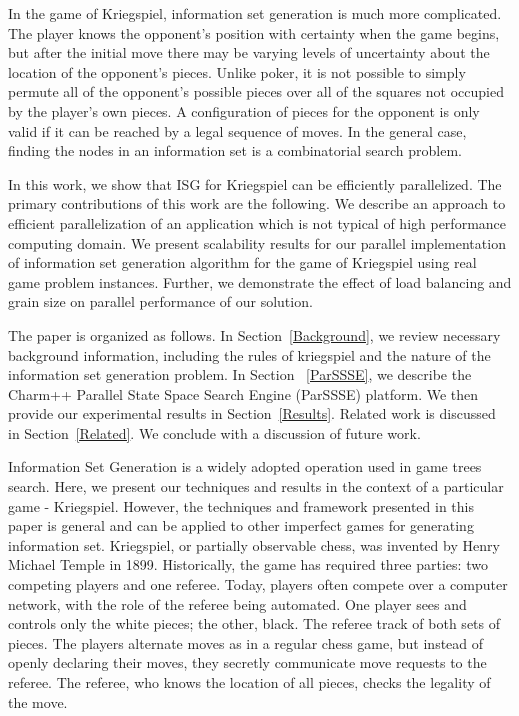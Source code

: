 \documentclass[times, 10pt,twocolumn]{article}
\begin{document}
In the game of Kriegspiel, information set generation is much more complicated.  The player knows the opponent's position with
certainty when the game begins, but after the initial move there may be varying levels of uncertainty about the location
of the opponent's pieces.  Unlike poker, it is not possible to simply permute all of the opponent's possible pieces over
all of the squares not occupied by the player's own pieces.  A configuration of pieces for the opponent is only valid if
it can be reached by a legal sequence of moves.  In the general case, finding the nodes in an information set is a
combinatorial search problem.

In this work, we show that ISG for Kriegspiel can be efficiently parallelized. The primary contributions of this work are the following. We describe an approach to efficient parallelization of an application which is not typical of high performance computing domain. We present scalability results for our parallel implementation of information set generation algorithm for the game of Kriegspiel using real game problem instances. Further, we demonstrate the effect of load balancing and grain size on parallel performance of our solution. 

The paper is organized as follows.  In Section~\ref{Background}, we review necessary background information, including the rules of kriegspiel and the nature of the information set generation problem.  In Section ~\ref{ParSSSE}, we describe the {\sc Charm++} Parallel State Space Search Engine (ParSSSE) platform.  We then provide our experimental results in Section~\ref{Results}.  Related work is discussed in Section~\ref{Related}.  We conclude with a discussion of future work.

Information Set Generation is a widely adopted operation used in game trees search. Here, we present our techniques and results in the context of a particular game - Kriegspiel. However, the techniques and framework presented in this paper is general and can be applied to other imperfect games for generating information set.
Kriegspiel, or partially observable chess,  was invented by Henry Michael Temple in 1899.  Historically, the
game has required three parties: two competing players and one referee.  Today,
players often compete over a computer network, with the role of the referee
being automated.  One player sees and controls only the white pieces; the
other, black.  The referee track of both sets of pieces.  The players alternate
moves as in a regular chess game, but instead of openly declaring their moves,
they secretly communicate move requests to the referee.  The referee, who knows
the location of all pieces, checks the legality of the move.  
\end{document}
